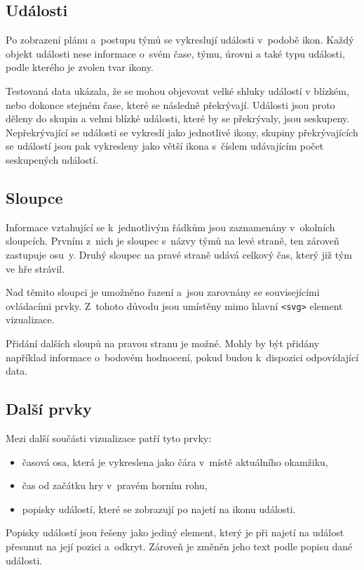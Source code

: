 \documentclass[
  digital, %
  oneside, %
  table,   %
  nolof,     %
  nolot,     %
]{fithesis3}
\begin{document}
\subsection{Události}
Po zobrazení plánu a~postupu týmů se vykreslují události v~podobě ikon. Každý objekt události nese informace o~svém čase, týmu, úrovni a také typu události, podle kterého je zvolen tvar ikony.\par Testovaná data ukázala, že se mohou objevovat velké shluky událostí v blízkém, nebo dokonce stejném čase, které se následně překrývají. Události jsou proto děleny do skupin a velmi blízké události, které by se překrývaly, jsou seskupeny. Nepřekrývající se události se vykreslí jako jednotlivé ikony, skupiny překrývajících se událostí jsou pak vykresleny jako větší ikona s~číslem udávajícím počet seskupených událostí.
\subsection{Sloupce}
Informace vztahující se k~jednotlivým řádkům jsou zaznamenány v~okolních sloupcích. Prvním z~nich je sloupec s~názvy týmů na levé straně, ten zároveň zastupuje osu~y. Druhý sloupec na pravé straně udává celkový čas, který již tým ve hře strávil.\par
Nad těmito sloupci je umožněno řazení a~jsou zarovnány se souvisejícími ovládacími prvky. Z~tohoto důvodu jsou umístěny mimo hlavní \verb|<svg>| element vizualizace.\par
Přidání dalších sloupů na pravou stranu je možné. Mohly by být přidány například informace o~bodovém hodnocení, pokud budou k~dispozici odpovídající data.
\subsection{Další prvky}
Mezi další součásti vizualizace patří tyto prvky:
\begin{itemize}
  \item časová osa, která je vykreslena jako čára v~místě aktuálního okamžiku,
  \item čas od začátku hry v~pravém horním rohu,
  \item popisky událostí, které se zobrazují po najetí na ikonu události.
\end{itemize}
Popisky událostí jsou řešeny jako jediný element, který je při najetí na událost přesunut na její pozici a~odkryt. Zároveň je změněn jeho text podle popisu dané události.
\end{document}
